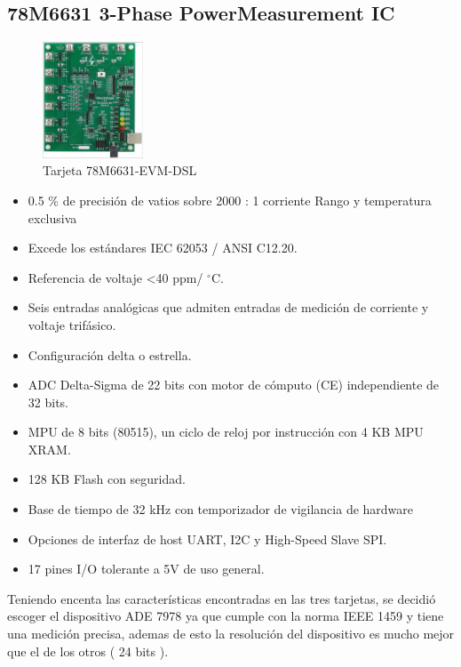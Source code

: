     \subsection{78M6631 3-Phase PowerMeasurement IC}
        \begin{figure}[H]
            \centering
            \includegraphics[width = 3cm]{3Proyecto/78M6631-EVM-DSL}
            \caption{Tarjeta 78M6631-EVM-DSL}
            \label{fig:78M6631-EVM-DSL}
        \end{figure}
        \begin{itemize}
            \itemsep0em
            \item 0.5 \% de precisión de vatios sobre 2000 : 1 corriente Rango y temperatura exclusiva
            \item Excede los estándares IEC 62053 / ANSI C12.20.
            \item Referencia de voltaje <40 ppm/ $^{\circ}$C.
            \item Seis entradas analógicas que admiten entradas de medición de corriente y voltaje trifásico.
            \item Configuración delta o estrella.
            \item ADC Delta-Sigma de 22 bits con motor de cómputo (CE) independiente de 32 bits.
            \item MPU de 8 bits (80515), un ciclo de reloj por instrucción con 4 KB MPU XRAM.
            \item 128 KB Flash con seguridad.
            \item Base de tiempo de 32 kHz con temporizador de vigilancia de hardware
            \item Opciones de interfaz de host UART, I2C y High-Speed Slave SPI.
            \item 17 pines I/O tolerante a 5V de uso general.
        \end{itemize}

    Teniendo encenta las características encontradas en las tres tarjetas, se decidió escoger el dispositivo ADE 7978 ya que cumple con la norma IEEE 1459 y tiene una medición precisa, ademas de esto la resolución del dispositivo es mucho mejor que el de los otros ( 24 bits ).

